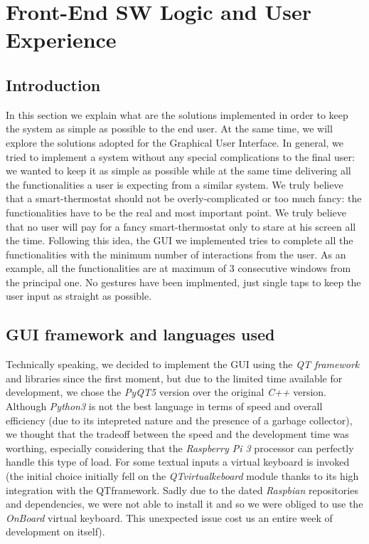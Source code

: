\documentclass[a4paper]{article}
\begin{document}
    \section{Front-End SW Logic and User Experience}
        \subsection{Introduction}
        In this section we explain what are the solutions implemented in order to keep the system as simple as possible to the end user. At the same time, we will explore the solutions adopted for the Graphical User Interface. In general, we tried to implement a system without any special complications to the final user: we wanted to keep it as simple as possible while at the same time delivering all the functionalities a user is expecting from a similar system. We truly believe that a smart-thermostat should not be overly-complicated or too much fancy: the functionalities have to be the real and most important point. We truly believe that no user will pay for a fancy smart-thermostat only to stare at his screen all the time.
        Following this idea, the GUI we implemented tries to complete all the functionalities with the minimum number of interactions from the user. As an example, all the functionalities are at maximum of 3 consecutive windows from the principal one. No gestures have been implmented, just single taps to keep the user input as straight as possible. 

        \subsection{GUI framework and languages used}
        Technically speaking, we decided to implement the GUI using the \emph{QT framework} and libraries since the first moment, but due to the limited time available for development, we chose the \emph{PyQT5} version over the original \emph{C++} version. Although \emph{Python3} is not the best language in terms of speed and overall efficiency (due to its intepreted nature and the presence of a garbage collector), we thought that the tradeoff between the speed and the development time was worthing, especially considering that the \emph{Raspberry Pi 3} processor can perfectly handle this type of load. For some textual inputs a virtual keyboard is invoked (the initial choice initially fell on the \emph{QTvirtualkeboard} module thanks to its high integration with the QTframework. Sadly due to the dated \emph{Raspbian} repositories and dependencies, we were not able to install it and so we were obliged to use the \emph{OnBoard} virtual keyboard. This unexpected issue cost us an entire week of development on itself).
\end{document}
